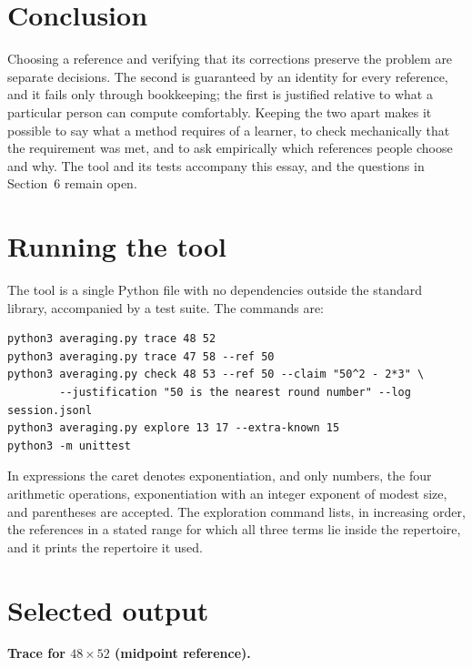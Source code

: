 \documentclass[11pt]{article}
\theoremstyle{definition}
\theoremstyle{remark}
\begin{document}
\section{Conclusion}

Choosing a reference and verifying that its corrections preserve the problem are separate decisions. The second is guaranteed by an identity for every reference, and it fails only through bookkeeping; the first is justified relative to what a particular person can compute comfortably. Keeping the two apart makes it possible to say what a method requires of a learner, to check mechanically that the requirement was met, and to ask empirically which references people choose and why. The tool and its tests accompany this essay, and the questions in Section~6 remain open.

\appendix

\section{Running the tool}

The tool is a single Python file with no dependencies outside the standard library, accompanied by a test suite. The commands are:
\begin{verbatim}
python3 averaging.py trace 48 52
python3 averaging.py trace 47 58 --ref 50
python3 averaging.py check 48 53 --ref 50 --claim "50^2 - 2*3" \
        --justification "50 is the nearest round number" --log session.jsonl
python3 averaging.py explore 13 17 --extra-known 15
python3 -m unittest
\end{verbatim}
In expressions the caret denotes exponentiation, and only numbers, the four arithmetic operations, exponentiation with an integer exponent of modest size, and parentheses are accepted. The exploration command lists, in increasing order, the references in a stated range for which all three terms lie inside the repertoire, and it prints the repertoire it used.

\section{Selected output}

\medskip
\noindent\begin{minipage}{\linewidth}
\noindent\textbf{Trace for $48\times 52$ (midpoint reference).}
\begin{small}
\end{small}
\end{minipage}
\end{document}
